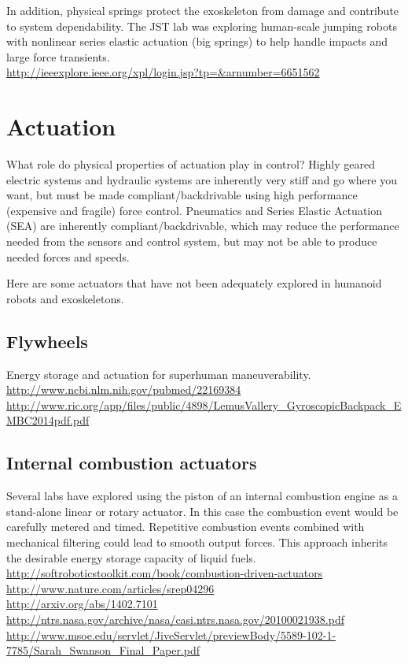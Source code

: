 \documentclass[letterpaper,12pt,fullpage]{article}
\begin{document}
In addition, physical springs protect the exoskeleton from damage
and contribute to system dependability.
The JST lab was exploring human-scale jumping robots
with 
nonlinear series elastic actuation (big springs)
to help handle impacts and large force
transients.\\
\url{http://ieeexplore.ieee.org/xpl/login.jsp?tp=&arnumber=6651562}\\

\section{Actuation}

What role do physical properties of actuation play in control? Highly
geared electric systems and hydraulic systems are inherently very
stiff and go where you want, but must be made compliant/backdrivable
using high performance (expensive and fragile) force control.
Pneumatics and Series Elastic Actuation (SEA) are inherently
compliant/backdrivable, which may reduce the performance
needed from the sensors and control system, but may not be able to
produce needed forces and speeds.

Here are some actuators
that have not been adequately explored
in humanoid robots and exoskeletons.

\subsection{Flywheels}

Energy storage and actuation for superhuman maneuverability.\\
\url{http://www.ncbi.nlm.nih.gov/pubmed/22169384}\\
\url{http://www.ric.org/app/files/public/4898/LemusVallery_GyroscopicBackpack_EMBC2014pdf.pdf}


\subsection{Internal combustion actuators}

Several labs have explored using the piston of an internal combustion
engine as a stand-alone linear or rotary actuator. In this case
the combustion event would be carefully metered and timed. Repetitive
combustion events combined with mechanical filtering could lead to smooth
output forces. This approach inherits the desirable energy storage capacity
of liquid fuels.\\ 
\url{http://softroboticstoolkit.com/book/combustion-driven-actuators}\\
\url{http://www.nature.com/articles/srep04296}\\
\url{http://arxiv.org/abs/1402.7101}\\
\url{http://ntrs.nasa.gov/archive/nasa/casi.ntrs.nasa.gov/20100021938.pdf}\\
\url{http://www.msoe.edu/servlet/JiveServlet/previewBody/5589-102-1-7785/Sarah_Swanson_Final_Paper.pdf}
\end{document}
